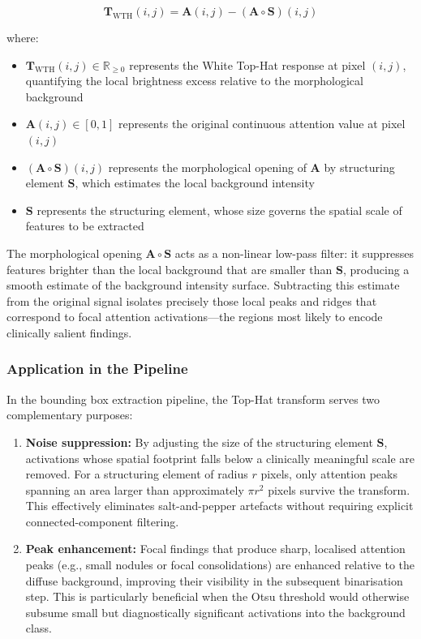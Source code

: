 \begin{equation}
\label{eq:tophat}
\mathbf{T}_{\text{WTH}}(i,j) = \mathbf{A}(i,j) - (\mathbf{A} \circ \mathbf{S})(i,j)
\end{equation}

where:
\begin{itemize}
\item $\mathbf{T}_{\text{WTH}}(i,j) \in \mathbb{R}_{\geq 0}$ represents the White Top-Hat response at pixel $(i,j)$, quantifying the local brightness excess relative to the morphological background
\item $\mathbf{A}(i,j) \in [0,1]$ represents the original continuous attention value at pixel $(i,j)$
\item $(\mathbf{A} \circ \mathbf{S})(i,j)$ represents the morphological opening of $\mathbf{A}$ by structuring element $\mathbf{S}$, which estimates the local background intensity
\item $\mathbf{S}$ represents the structuring element, whose size governs the spatial scale of features to be extracted
\end{itemize}

The morphological opening $\mathbf{A} \circ \mathbf{S}$ acts as a non-linear low-pass filter: it suppresses features brighter than the local background that are smaller than $\mathbf{S}$, producing a smooth estimate of the background intensity surface. Subtracting this estimate from the original signal isolates precisely those local peaks and ridges that correspond to focal attention activations---the regions most likely to encode clinically salient findings.

\subsubsection{Application in the Pipeline}

In the bounding box extraction pipeline, the Top-Hat transform serves two complementary purposes:

\begin{enumerate}
    \item \textbf{Noise suppression:} By adjusting the size of the structuring element $\mathbf{S}$, activations whose spatial footprint falls below a clinically meaningful scale are removed. For a structuring element of radius $r$ pixels, only attention peaks spanning an area larger than approximately $\pi r^2$ pixels survive the transform. This effectively eliminates salt-and-pepper artefacts without requiring explicit connected-component filtering.

    \item \textbf{Peak enhancement:} Focal findings that produce sharp, localised attention peaks (e.g., small nodules or focal consolidations) are enhanced relative to the diffuse background, improving their visibility in the subsequent binarisation step. This is particularly beneficial when the Otsu threshold would otherwise subsume small but diagnostically significant activations into the background class.
\end{enumerate}

